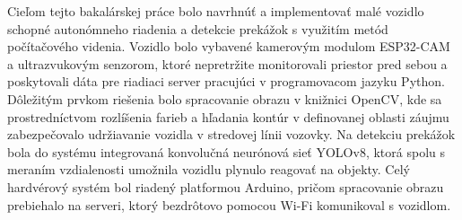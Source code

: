 Cieľom tejto bakalárskej práce bolo navrhnúť a implementovať malé vozidlo schopné autonómneho riadenia a detekcie prekážok s využitím metód počítačového videnia. Vozidlo bolo vybavené kamerovým modulom ESP32-CAM a ultrazvukovým senzorom, ktoré nepretržite monitorovali priestor pred sebou a poskytovali dáta pre riadiaci server pracujúci v programovacom jazyku Python. Dôležitým prvkom riešenia bolo spracovanie obrazu v knižnici OpenCV, kde sa prostredníctvom rozlíšenia farieb a hľadania kontúr v definovanej oblasti záujmu zabezpečovalo udržiavanie vozidla v stredovej línii vozovky. Na detekciu prekážok bola do systému integrovaná konvolučná neurónová sieť YOLOv8, ktorá spolu s meraním vzdialenosti umožnila vozidlu plynulo reagovať na objekty. Celý hardvérový systém bol riadený platformou Arduino, pričom spracovanie obrazu prebiehalo na serveri, ktorý bezdrôtovo pomocou Wi-Fi komunikoval s vozidlom.
